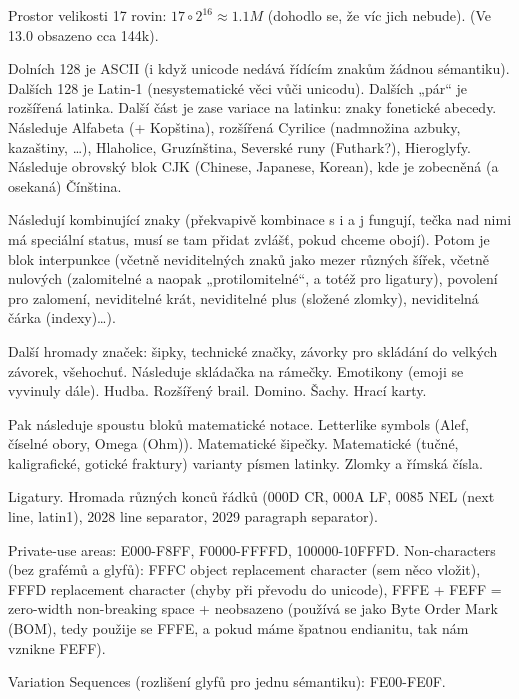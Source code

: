 \documentclass[12pt]{article}					%
\begin{document}
    \begin{definice}[Codepoints]
        Prostor velikosti 17 rovin: $17 \circ 2^{16} \approx 1.1M$ (dohodlo se, že víc jich nebude). (Ve 13.0 obsazeno cca 144k).

        Dolních 128 je ASCII (i když unicode nedává řídícím znakům žádnou sémantiku). Dalších 128 je Latin-1 (nesystematické věci vůči unicodu). Dalších „pár“ je rozšířená latinka. Další část je zase variace na latinku: znaky fonetické abecedy. Následuje Alfabeta (+ Kopština), rozšířená Cyrilice (nadmnožina azbuky, kazaštiny, …), Hlaholice, Gruzínština, Severské runy (Futhark?), Hieroglyfy. Následuje obrovský blok CJK (Chinese, Japanese, Korean), kde je zobecněná (a osekaná) Čínština.

        Následují kombinující znaky (překvapivě kombinace s i a j fungují, tečka nad nimi má speciální status, musí se tam přidat zvlášť, pokud chceme obojí). Potom je blok interpunkce (včetně neviditelných znaků jako mezer různých šířek, včetně nulových (zalomitelné a naopak „protilomitelné“, a totéž pro ligatury), povolení pro zalomení, neviditelné krát, neviditelné plus (složené zlomky), neviditelná čárka (indexy)…).

        Další hromady značek: šipky, technické značky, závorky pro skládání do velkých závorek, všehochuť. Následuje skládačka na rámečky. Emotikony (emoji se vyvinuly dále). Hudba. Rozšířený brail. Domino. Šachy. Hrací karty.

        Pak následuje spoustu bloků matematické notace. Letterlike symbols (Alef, číselné obory, Omega (Ohm)). Matematické šipečky. Matematické (tučné, kaligrafické, gotické fraktury) varianty písmen latinky. Zlomky a římská čísla.

        Ligatury. Hromada různých konců řádků (000D CR, 000A LF, 0085 NEL (next line, latin1), 2028 line separator, 2029 paragraph separator).

        Private-use areas: E000-F8FF, F0000-FFFFD, 100000-10FFFD. Non-characters (bez grafémů a glyfů): FFFC object replacement character (sem něco vložit), FFFD replacement character (chyby při převodu do unicode), FFFE + FEFF = zero-width non-breaking space + neobsazeno (používá se jako Byte Order Mark (BOM), tedy použije se FFFE, a pokud máme špatnou endianitu, tak nám vznikne FEFF).

        Variation Sequences (rozlišení glyfů pro jednu sémantiku): FE00-FE0F.
    \end{definice}
\end{document}
